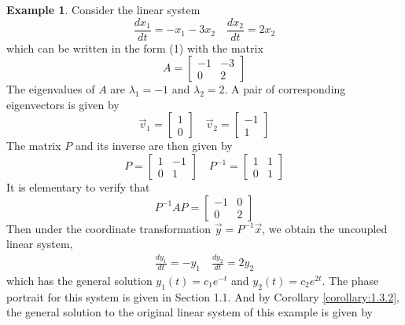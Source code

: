 \documentclass[11pt]{book}
\theoremstyle{definition}\newtheorem{definition}[subsection]{Definition}
\theoremstyle{definition}\newtheorem{example}[subsection]{Example}
\theoremstyle{definition}\newtheorem{notation}[subsection]{Notation}
\theoremstyle{definition}\newtheorem{remark}[subsection]{Remark}
\theoremstyle{theorem}\newtheorem{theorem}[subsection]{Theorem}
\theoremstyle{theorem}\newtheorem{lemma}[subsection]{Lemma}
\theoremstyle{theorem}\newtheorem{proposition}[subsection]{Proposition}
\theoremstyle{theorem}\newtheorem{corollary}[subsection]{Corollary}
\theoremstyle{theorem}\newtheorem{case}{Case}
\theoremstyle{remark}\newtheorem{subcase}{Subcase}[case]
\begin{document}
\begin{example}\label{example:1.3.3}
    Consider the linear system
    \begin{equation*}
        \frac{dx_1}{dt} = -x_1 - 3x_2 \quad \frac{dx_2}{dt} = 2x_2
    \end{equation*}
    which can be written in the form (1) with the matrix
    \begin{equation*}
        A = \begin{bmatrix}
            -1 & -3 \\
            0 & 2
        \end{bmatrix}
    \end{equation*}
    The eigenvalues of $A$ are $\lambda_1 = -1$ and $\lambda_2 = 2$. A pair of corresponding eigenvectors is given by
    \begin{equation*}
        \vec{v}_1 = \begin{bmatrix} 1 \\ 0 \end{bmatrix} \quad 
        \vec{v}_2 = \begin{bmatrix} -1 \\ 1 \end{bmatrix}
    \end{equation*}
    The matrix $P$ and its inverse are then given by
    \begin{equation*}
        P = \begin{bmatrix} 1 & -1 \\ 0 & 1 \end{bmatrix} \quad P^{-1} = \begin{bmatrix} 1 & 1 \\ 0 & 1 \end{bmatrix}
    \end{equation*}
    It is elementary to verify that
    \begin{equation*}
        P^{-1}AP = \begin{bmatrix} -1 & 0 \\ 0 & 2 \end{bmatrix}
    \end{equation*}
    Then under the coordinate transformation $\vec{y} = P^{-1}\vec{x}$, we obtain the uncoupled linear system,
    \begin{align*}
        \frac{dy_1}{dt} = -y_1 \quad \frac{dy_2}{dt} = 2y_2
    \end{align*}
    which has the general solution $y_1(t) = c_1e^{-t}$ and $y_2(t) = c_2e^{2t}$. The phase portrait for this system is given in Section 1.1. And by Corollary \ref{corollary:1.3.2}, the general solution to the original linear system of this example is given by

\end{example}
\end{document}
